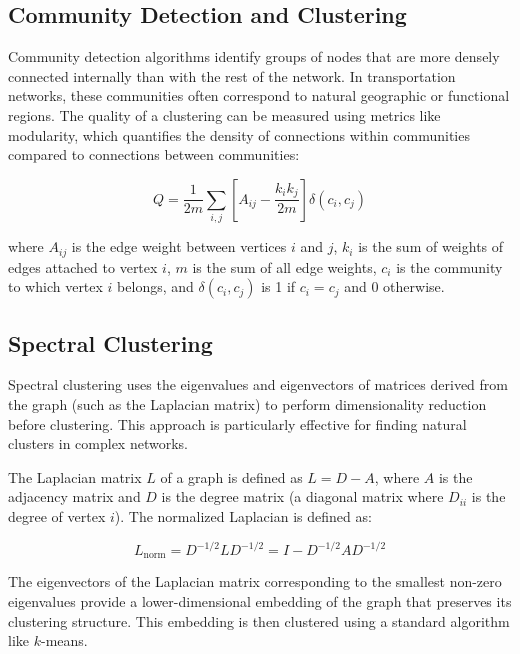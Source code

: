 \subsection{Community Detection and Clustering}

Community detection algorithms identify groups of nodes that are more densely connected internally than with the rest of the network. In transportation networks, these communities often correspond to natural geographic or functional regions. The quality of a clustering can be measured using metrics like modularity, which quantifies the density of connections within communities compared to connections between communities:

\begin{equation}
    Q = \frac{1}{2m} \sum_{i,j} \left[A_{ij} - \frac{k_i k_j}{2m}\right] \delta(c_i, c_j)
\end{equation}

where $A_{ij}$ is the edge weight between vertices $i$ and $j$, $k_i$ is the sum of weights of edges attached to vertex $i$, $m$ is the sum of all edge weights, $c_i$ is the community to which vertex $i$ belongs, and $\delta(c_i, c_j)$ is 1 if $c_i = c_j$ and 0 otherwise.

\subsection{Spectral Clustering}
\label{subsec:SpectralClustering}

Spectral clustering uses the eigenvalues and eigenvectors of matrices derived from the graph (such as the Laplacian matrix) to perform dimensionality reduction before clustering. This approach is particularly effective for finding natural clusters in complex networks.

The Laplacian matrix $L$ of a graph is defined as $L = D - A$, where $A$ is the adjacency matrix and $D$ is the degree matrix (a diagonal matrix where $D_{ii}$ is the degree of vertex $i$). The normalized Laplacian is defined as:

\begin{equation}
    L_{\text{norm}} = D^{-1/2} L D^{-1/2} = I - D^{-1/2} A D^{-1/2}
\end{equation}

The eigenvectors of the Laplacian matrix corresponding to the smallest non-zero eigenvalues provide a lower-dimensional embedding of the graph that preserves its clustering structure. This embedding is then clustered using a standard algorithm like $k$-means.

